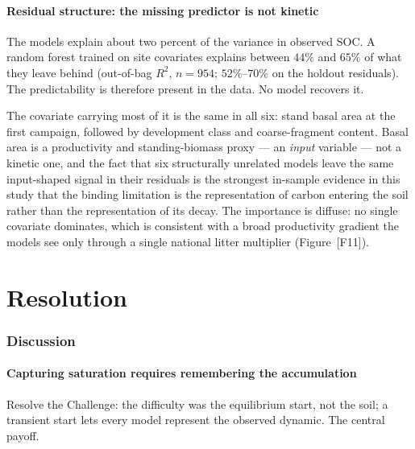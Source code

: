 \documentclass[11pt]{article}
\begin{document}
\subsection{Residual structure: the missing predictor is not kinetic}
The models explain about two percent of the variance in observed SOC. A random
forest trained on site covariates explains between $44\%$ and $65\%$ of what
they leave behind (out-of-bag $R^2$, $n = 954$; $52\%$--$70\%$ on the holdout
residuals). The predictability is therefore present in the data. No model
recovers it.

The covariate carrying most of it is the same in all six: stand basal area at
the first campaign, followed by development class and coarse-fragment content.
Basal area is a productivity and standing-biomass proxy --- an \emph{input}
variable --- not a kinetic one, and the fact that six structurally unrelated
models leave the same input-shaped signal in their residuals is the strongest
in-sample evidence in this study that the binding limitation is the
representation of carbon entering the soil rather than the representation of its
decay. The importance is diffuse: no single covariate dominates, which is
consistent with a broad productivity gradient the models see only through a
single national litter multiplier (Figure~[F11]).

\part{Resolution}

\section{Discussion}

\subsection{Capturing saturation requires remembering the accumulation}
Resolve the Challenge: the difficulty was the equilibrium start, not the soil;
a transient start lets every model represent the observed dynamic. The central
payoff.
\end{document}
